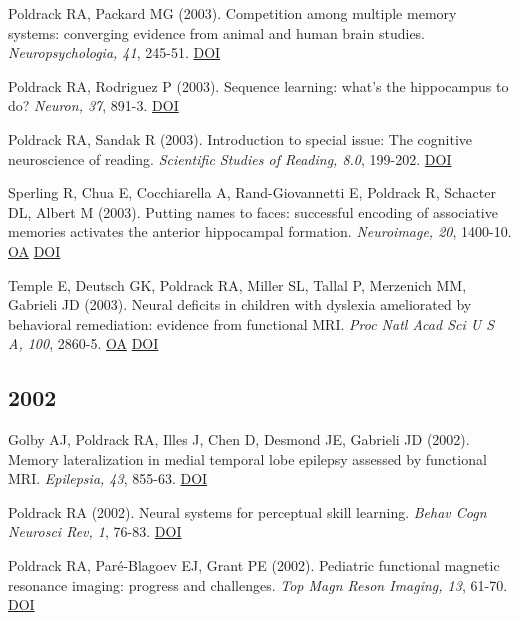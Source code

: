 \documentclass[10pt, letterpaper]{article}
\begin{document}
Poldrack RA, Packard MG (2003). Competition among multiple memory systems: converging evidence from animal and human brain studies. \textit{Neuropsychologia, 41}, 245-51. \href{http://dx.doi.org/10.1016/s0028-3932(02)00157-4}{DOI} \vspace{2mm}

Poldrack RA, Rodriguez P (2003). Sequence learning: what's the hippocampus to do? \textit{Neuron, 37}, 891-3. \href{http://dx.doi.org/10.1016/s0896-6273(03)00159-4}{DOI} \vspace{2mm}

Poldrack RA, Sandak R (2003). Introduction to special issue: The cognitive neuroscience of reading. \textit{Scientific Studies of Reading, 8.0}, 199-202. \href{http://dx.doi.org/None}{DOI} \vspace{2mm}

Sperling R, Chua E, Cocchiarella A, Rand-Giovannetti E, Poldrack R, Schacter DL, Albert M (2003). Putting names to faces: successful encoding of associative memories activates the anterior hippocampal formation. \textit{Neuroimage, 20}, 1400-10. \href{https://www.ncbi.nlm.nih.gov/pmc/articles/PMC3230827}{OA} \href{http://dx.doi.org/10.1016/s1053-8119(03)00391-4}{DOI} \vspace{2mm}

Temple E, Deutsch GK, Poldrack RA, Miller SL, Tallal P, Merzenich MM, Gabrieli JD (2003). Neural deficits in children with dyslexia ameliorated by behavioral remediation: evidence from functional MRI. \textit{Proc Natl Acad Sci U S A, 100}, 2860-5. \href{https://www.ncbi.nlm.nih.gov/pmc/articles/PMC151431}{OA} \href{http://dx.doi.org/10.1073/pnas.0030098100}{DOI} \vspace{2mm}

\subsection*{2002}Golby AJ, Poldrack RA, Illes J, Chen D, Desmond JE, Gabrieli JD (2002). Memory lateralization in medial temporal lobe epilepsy assessed by functional MRI. \textit{Epilepsia, 43}, 855-63. \href{http://dx.doi.org/10.1046/j.1528-1157.2002.20501.x}{DOI} \vspace{2mm}

Poldrack RA (2002). Neural systems for perceptual skill learning. \textit{Behav Cogn Neurosci Rev, 1}, 76-83. \href{http://dx.doi.org/10.1177/1534582302001001005}{DOI} \vspace{2mm}

Poldrack RA, Paré-Blagoev EJ, Grant PE (2002). Pediatric functional magnetic resonance imaging: progress and challenges. \textit{Top Magn Reson Imaging, 13}, 61-70. \href{http://dx.doi.org/10.1097/00002142-200202000-00005}{DOI} \vspace{2mm}
\end{document}
